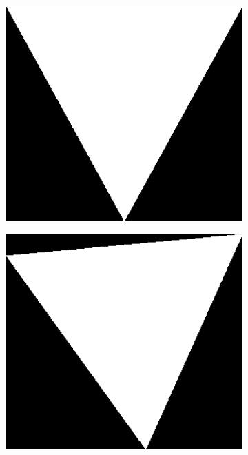 \documentclass{report}
\begin{document}
\begin{figure}
  \begin{subfigure}[t]{0.3\textwidth}
    \includegraphics[width=1\textwidth]{src/patmatch_ref}
  \end{subfigure}
  \qquad
  \begin{subfigure}[t]{0.3\textwidth}
    \includegraphics[width=1\textwidth]{src/patmatch_tri1}

\end{subfigure}
\end{figure}
\end{document}
